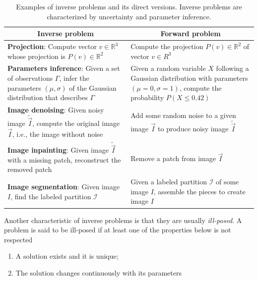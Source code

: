 \begin{table}
\renewcommand{\arraystretch}{1.5}
\footnotesize
\begin{tabular}{|m{7cm}|m{7cm}|}
\hline
\multicolumn{1}{|c|}{\textbf{Inverse problem}} & \multicolumn{1}{c|}{\textbf{Forward problem}} \\
\hline
\textbf{Projection}: Compute vector $v \in \mathbb{R}^3$ whose projection is $P(v) \in \mathbb{R}^2$ & Compute the projection $P(v) \in \mathbb{R}^2$ of vector $v \in R^3$\\
\hline
\textbf{Parameters inference}: Given a set of observations $\Gamma$, infer the parameters $(\mu,\sigma)$ of the Gaussian distribution that describes $\Gamma$ & Given a random variable $X$ following a Gaussian distribution with parameters $(\mu=0,\sigma=1)$, compute the probability $P(X \leq 0.42)$\\
\hline
\textbf{Image denoising}: Given noisy image $\widetilde{\vec{I}}$, compute the original image $\vec{I}$, i.e., the image without noise & Add some random noise to a given image $\vec{I}$ to produce noisy image $\widetilde{\vec{I}}$\\
\hline
\textbf{Image inpainting}: Given image $\widetilde{\vec{I}}$ with a missing patch, reconstruct the removed patch & Remove a patch from image $\vec{I}$ \\
\hline
\textbf{Image segmentation}: Given image $I$, find the labeled partition $\mathcal{I}$ & Given a labeled partition $\mathcal{I}$ of some image $I$, assemble the pieces to create image $I$\\
\hline
\end{tabular}
\caption{Examples of inverse problems and its direct versions. Inverse problems are characterized by uncertainty and parameter inference. }
\label{ch1:tab:inverse-problems-list}
\end{table}


Another characteristic of inverse problems is that they are usually \emph{ill-posed}. A problem is said to be ill-posed if at least one of the properties below is not respected

\begin{enumerate}
\item{A solution exists and it is unique;}
\item{The solution changes continuously with its parameters}
\end{enumerate}



